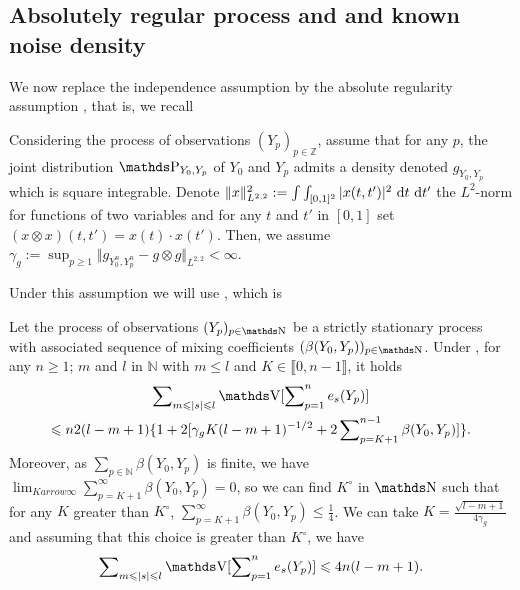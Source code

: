 \subsection{Absolutely regular process and and known noise density}\label{FREQ_CIRCDECONV_KNOWN_BETA}

We now replace the independence assumption  by the absolute regularity assumption , that is, we recall
\begin{as*}
Considering the process of observations $(Y_{p})_{p \in \mathds{Z}}$, assume that for any $p$, the joint distribution $\P_{Y_{0}, Y_{p}}$ of $Y_{0}$ and $Y_{p}$ admits a density denoted $g_{Y_{0}, Y_{p}}$ which is square integrable.
Denote $\Vert x \Vert_{L^{2, 2}}^{2} := \int\int_{[0, 1]^{2}} \vert x(t, t')\vert^{2} \operatorname{\, d \!} t \operatorname{\, d \!} t'$ the $L^{2}$-norm for functions of two variables and for any $t$ and $t'$ in $[0, 1]$ set $(x \otimes x)(t, t') = x(t) \cdot x(t')$.
Then, we assume $\gamma_{g} := \sup\nolimits_{p \geq 1} \Vert g_{Y_{0}^{n}, Y_{p}^{n}} - g \otimes g \Vert_{L^{2, 2}} < \infty$.
\assEnd
\end{as*}

Under this assumption we will use , which is
\begin{lm*}
Let the process of observations $(Y_{p})_{p \in \N}$ be a strictly stationary process with associated sequence of mixing coefficients $ (\beta(Y_{0}, Y_{p}) )_{p \in \N}$.
Under , for any $n \geq 1$; $m$ and $l$ in $\mathds{N}$ with $m \leq l$ and $K \in \llbracket 0, n-1\rrbracket$, it holds
\begin{multline*}
\sum\nolimits_{m \leq \vert s \vert \leq l} \V [\sum\nolimits_{p = 1}^{n} e_{s}(Y_{p}) ]\\
    \leq n 2 (l-m+1)  \{1 + 2 [\gamma_{g} K(l-m+1)^{-1/2} + 2 \sum\nolimits_{p = K + 1}^{n - 1} \beta(Y_{0}, Y_{p}) ] \}.
\end{multline*}
Moreover, as $\sum\nolimits_{p \in \mathds{N}} \beta(Y_{0}, Y_{p})$ is finite, we have $\lim\nolimits_{K  arrow \infty} \sum\nolimits_{p = K + 1}^{\infty} \beta(Y_{0}, Y_{p}) = 0$, so we can find $K^{\circ}$ in $\N$ such that for any $K$ greater than $K^{\circ}$, $\sum\nolimits_{p = K + 1}^{\infty} \beta(Y_{0}, Y_{p}) \leq \tfrac{1}{4}$.
We can take $K = \tfrac{\sqrt{l - m + 1}}{4 \gamma_{g}}$ and assuming that this choice is greater than $K^{\circ}$, we have
\[\sum\nolimits_{m \leq \vert s \vert \leq l} \V [\sum\nolimits_{p = 1}^{n} e_{s}(Y_{p}) ] \leq 4 n (l-m+1).\]
\reEnd
\end{lm*}

